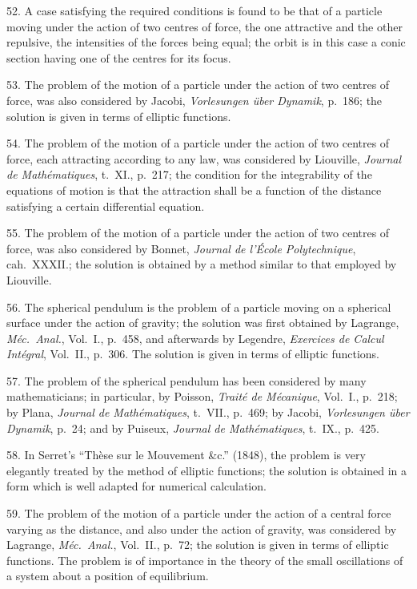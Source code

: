\documentclass[11pt,a4paper]{book}
\begin{document}
52. A case satisfying the required conditions is found to be that of a particle moving under the action of two centres of force, the one attractive and the other repulsive, the intensities of the forces being equal; the orbit is in this case a conic section having one of the centres for its focus.

53. The problem of the motion of a particle under the action of two centres of force, was also considered by Jacobi, \textit{Vorlesungen \"uber Dynamik}, p.~186; the solution is given in terms of elliptic functions.

\newpage
\setcounter{page}{520}

54. The problem of the motion of a particle under the action of two centres of force, each attracting according to any law, was considered by Liouville, \textit{Journal de Math\'ematiques}, t.~XI., p.~217; the condition for the integrability of the equations of motion is that the attraction shall be a function of the distance satisfying a certain differential equation.

55. The problem of the motion of a particle under the action of two centres of force, was also considered by Bonnet, \textit{Journal de l'\'Ecole Polytechnique}, cah.~XXXII.; the solution is obtained by a method similar to that employed by Liouville.

56. The spherical pendulum is the problem of a particle moving on a spherical surface under the action of gravity; the solution was first obtained by Lagrange, \textit{M\'ec.\ Anal.}, Vol.~I., p.~458, and afterwards by Legendre, \textit{Exercices de Calcul Int\'egral}, Vol.~II., p.~306. The solution is given in terms of elliptic functions.

57. The problem of the spherical pendulum has been considered by many mathematicians; in particular, by Poisson, \textit{Trait\'e de M\'ecanique}, Vol.~I., p.~218; by Plana, \textit{Journal de Math\'ematiques}, t.~VII., p.~469; by Jacobi, \textit{Vorlesungen \"uber Dynamik}, p.~24; and by Puiseux, \textit{Journal de Math\'ematiques}, t.~IX., p.~425.

58. In Serret's ``Th\`ese sur le Mouvement \&c.'' (1848), the problem is very elegantly treated by the method of elliptic functions; the solution is obtained in a form which is well adapted for numerical calculation.

\newpage
\setcounter{page}{525}

59. The problem of the motion of a particle under the action of a central force varying as the distance, and also under the action of gravity, was considered by Lagrange, \textit{M\'ec.\ Anal.}, Vol.~II., p.~72; the solution is given in terms of elliptic functions. The problem is of importance in the theory of the small oscillations of a system about a position of equilibrium.
\end{document}
